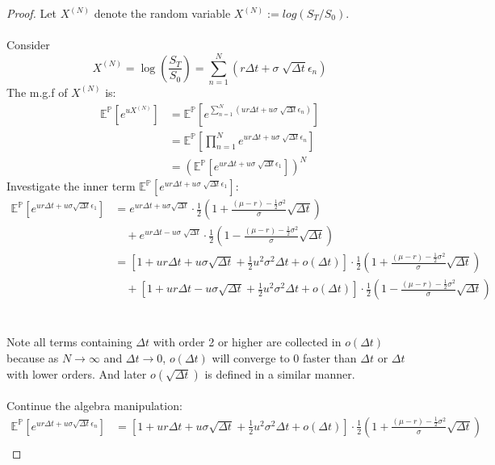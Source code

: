 \documentclass[12pt]{article}
\begin{document}
\begin{proof}
Let $X^(N)$ denote the random variable $X^{(N)} := log(S_T/S_0)$.
\\\\
Consider \[X^{(N)} = \log(\frac{S_T}{S_0}) = \sum_{n=1}^N (r\Delta t+\sigma \sqrt[]{\Delta t} \epsilon_n)\]
The m.g.f of $X^{(N)}$ is: \\
\begin{align*}
  \mathbb{E}^\mathbb{P}[e^{u X^{(N)}}] & =  \mathbb{E}^\mathbb{P}[e^{\sum_{n=1}^N (u r\Delta t+u\sigma \sqrt[]{\Delta t} \epsilon_n)}] \\
  & = \mathbb{E}^\mathbb{P} [\prod_{n=1}^N e^{u r\Delta t+u\sigma \sqrt[]{\Delta t} \epsilon_n}] \\
  & = (\mathbb{E}^\mathbb{P} [e^{u r\Delta t+u\sigma \sqrt[]{\Delta t} \epsilon_1}])^N \tag*{as $\epsilon_n$ is i.i.d}
\end{align*}
Investigate the inner term $\mathbb{E}^\mathbb{P} [e^{u r\Delta t+ u\sigma \sqrt[]{\Delta t} \epsilon_1}]$:
\begin{align*}
  \mathbb{E}^\mathbb{P} [e^{u r\Delta t+u\sigma \sqrt{\Delta t} \epsilon_1}] &= e^{u r\Delta t +u\sigma \sqrt{\Delta t}} \cdot \frac{1}{2} (1 + \frac{(\mu -r) - \frac{1}{2}\sigma^2}{\sigma} \sqrt{\Delta t}) \\ 
    & \quad + e^{u r\Delta t-u\sigma \sqrt[]{\Delta t}} \cdot \frac{1}{2} (1 - \frac{(\mu -r) - \frac{1}{2}\sigma^2}{\sigma} \sqrt{\Delta t}) \\
    &= [1+u r\Delta t+u \sigma \sqrt{\Delta t} +\frac{1}{2}u^2\sigma^2\Delta t + o(\Delta t)] \cdot \frac{1}{2} (1 + \frac{(\mu -r) - \frac{1}{2}\sigma^2}{\sigma} \sqrt{\Delta t}) \\ 
    & \quad + [1+u r\Delta t-u \sigma \sqrt{\Delta t} +\frac{1}{2}u^2\sigma^2\Delta t + o(\Delta t)] \cdot \frac{1}{2} (1 - \frac{(\mu -r) - \frac{1}{2}\sigma^2}{\sigma} \sqrt{\Delta t}) 
\end{align*} \\
\\
Note all terms containing $\Delta t$ with order 2 or higher are collected in $o(\Delta t)$ because as $N\rightarrow \infty$ 
and $\Delta t \rightarrow 0$, $o(\Delta t)$ will converge to 0 faster than $\Delta t$ or $\Delta t$ with lower orders.
And later $o(\sqrt{\Delta t})$ is defined in a similar manner. 
\\ \\ 
Continue the algebra manipulation:
\begin{align*}
  \mathbb{E}^\mathbb{P} [e^{u r\Delta t+u\sigma \sqrt{\Delta t} \epsilon_n}] &= [1+u r\Delta t+u \sigma \sqrt{\Delta t} +\frac{1}{2}u^2\sigma^2\Delta t + o(\Delta t)] \cdot \frac{1}{2} (1 + \frac{(\mu -r) - \frac{1}{2}\sigma^2}{\sigma} \sqrt{\Delta t}) \\ 

\end{align*}
\end{proof}
\end{document}
